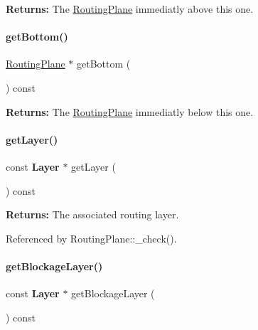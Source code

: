 {\bfseries Returns\+:} The \hyperlink{classKite_1_1RoutingPlane}{Routing\+Plane} immediatly above this one. \mbox{\label{classKite_1_1RoutingPlane_a7478ed4841ef25190c021165dd457520}} 
\paragraph{\texorpdfstring{get\+Bottom()}{getBottom()}}
{\footnotesize\ttfamily \hyperlink{classKite_1_1RoutingPlane}{Routing\+Plane} $\ast$ get\+Bottom (\begin{DoxyParamCaption}{ }\end{DoxyParamCaption}) const}

{\bfseries Returns\+:} The \hyperlink{classKite_1_1RoutingPlane}{Routing\+Plane} immediatly below this one. \mbox{\label{classKite_1_1RoutingPlane_ab045567c4f529dca7790d66c17c3084f}} 
\paragraph{\texorpdfstring{get\+Layer()}{getLayer()}}
{\footnotesize\ttfamily const \textbf{ Layer} $\ast$ get\+Layer (\begin{DoxyParamCaption}{ }\end{DoxyParamCaption}) const\hspace{0.3cm}{\ttfamily [inline]}}

{\bfseries Returns\+:} The associated routing layer. 

Referenced by Routing\+Plane\+::\+\_\+check().

\mbox{\label{classKite_1_1RoutingPlane_a4e47dfca4bfafa56d9c0f1dc39dc237e}} 
\paragraph{\texorpdfstring{get\+Blockage\+Layer()}{getBlockageLayer()}}
{\footnotesize\ttfamily const \textbf{ Layer} $\ast$ get\+Blockage\+Layer (\begin{DoxyParamCaption}{ }\end{DoxyParamCaption}) const\hspace{0.3cm}{\ttfamily [inline]}}

